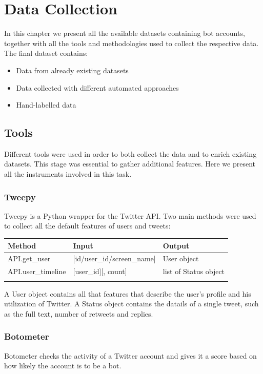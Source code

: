 
\chapter{Data Collection}
\label{capitolo3}
\thispagestyle{empty}


In this chapter we present all the available datasets containing bot accounts, together with all the tools and methodologies used to collect the respective data. The final dataset contains:

\begin{itemize}
\item[\PencilRight]Data from already existing datasets
\item[\PencilRight]Data collected with different automated approaches
\item[\PencilRight]Hand-labelled data
\end{itemize}

\section{Tools}
Different tools were used in order to both collect the data and to enrich existing datasets. This stage was essential to gather additional features. Here we present all the instruments involved in this task.

\subsection{Tweepy}
Tweepy is a Python wrapper for the Twitter API.
Two main methods were used to collect all the default features of users and tweets:\\


\begin{tabular}{lll}
\centering	
	Method&Input&Output\\ \hline\hline
	API.get\_user&[id/user\_id/screen\_name]&User object\\
	API.user\_timeline&[user\_id][, count]&list of Status object\\ \hline\\
\end{tabular}

A User object contains all that features that describe the user's profile and his utilization of Twitter.
A Status object contains the datails of a single tweet, such as the full text, number of retweets and replies.

\subsection{Botometer}
Botometer \cite{Botometer} checks the activity of a Twitter account and gives it a score based on how likely the account is to be a bot.

